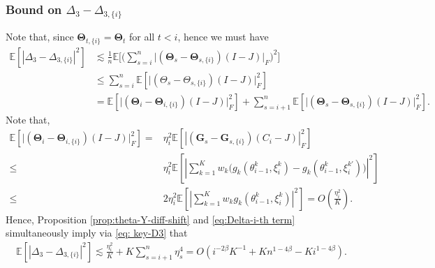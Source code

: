 \documentclass[a4paper,11pt]{article}
\numberwithin{equation}{section}
\theoremstyle{plain}
\theoremstyle{remark}
\def\IE{\mathbb{E}}
\def\bG{\mathbf{G}}
\def\bT{\mathbf{\Theta}}
\newcommand{\shift}[2]{#1_{#2, \{i\}}}
\begin{document}
\subsubsection{Bound on $\Delta_3 - \shift{\Delta}{3}$}
Note that, since $\shift{\bT}{t} =\bT_t$ for all $t<i$, hence we must have
\begin{align} 
    \IE[|\Delta_3 - \shift{\Delta}{3}|^2] &\lesssim \frac{1}{{n}} \IE\bigg[ \Big(\sum_{s=i}^n \big| (\bT_{s} -\shift{\bT}{s})(I-J)\big|_F\Big)^2\bigg]\nonumber\\
    &\leq \sum_{s=i}^n \IE[\big| (\Theta_{s} -\shift{\Theta}{s})(I-J)\big|_F^2] \nonumber\\ 
    &= \IE[\big| (\bT_{i} -\shift{\bT}{i})(I-J)\big|_F^2] + \sum_{s=i+1}^n \IE[\big| (\bT_{s} -\shift{\bT}{s})(I-J)\big|_F^2]. \label{eq: key-D3}
\end{align}
Note that, 
\begin{align}
    \IE[\big| (\bT_{i} -\shift{\bT}{i})(I-J)\big|_F^2] =& \eta_i^2 \IE[|(\bG_s - \shift{\bG}{s})(C_i - J)|_F^2] \nonumber\\
    \leq & \eta_i^2 \IE[|\sum_{k=1}^K w_k \big(g_k(\theta_{i-1}^k, \xi_i^k) - g_k(\theta_{i-1}^k, \xi_i^{k'}) \big)|^2] \nonumber\\
    \leq & 2 \eta_i^2 \IE[|\sum_{k=1}^K w_k g_k(\theta_{i-1}^k, \xi_i^k)|^2] = O(\frac{\eta_i^2}{K}). \label{eq:Delta-i-th term}
\end{align}
Hence, Proposition \ref{prop:theta-Y-diff-shift} and \eqref{eq:Delta-i-th term} simultaneously imply via \eqref{eq: key-D3} that 
\begin{align}
    \IE[|\Delta_3 - \shift{\Delta}{3}|^2] \lesssim \frac{\eta_i^2}{K} + K\sum_{s=i+1}^n \eta_s^4 = O(i^{-2\beta}K^{-1} +K n^{1-4\beta} - Ki^{1-4\beta}). \label{eq:bound on delta-3}
\end{align}
\end{document}
